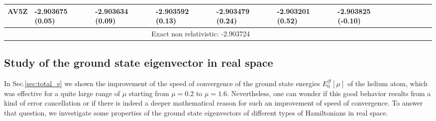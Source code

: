 \documentclass[aip,jcp,reprint,noshowkeys,superscriptaddress]{revtex4-1}
\newcommand{\basis}[0]{\mathcal{B}}
\begin{document}
\begin{table}
\begin{ruledtabular}
\begin{tabular}{llllllllllll}
 AV5Z        &    -2.903675 (0.05)   &    -2.903634 (0.09)   &    -2.903592 (0.13)   &    -2.903479 (0.24)  &    -2.903201 (0.52)  &    -2.903825 (-0.10)\\
\hline                                                                                                                                                   
\multicolumn{7}{c}{Exact non relativistic: -2.903724}   \\
\end{tabular}
\end{ruledtabular}
\end{table}

\subsection{Study of the ground state eigenvector in real space}
\label{sec:he_real_space}
In Sec.\ref{sec:total_e} we shown the improvement of the speed of convergence of the ground state energies $E_0^{\basis}[\mu]$ of the helium atom, which was effective for a quite large range of $\mu$ starting from $\mu=0.2$ to $\mu=1.6$. 
Nevertheless, one can wonder if this good behavior results from a kind of error cancellation or if there is indeed a deeper mathematical reason for such an improvement of speed of convergence. 
To answer that question, we investigate some properties of the ground state eigenvectors of different types of Hamiltonians in real space. 
\end{document}
